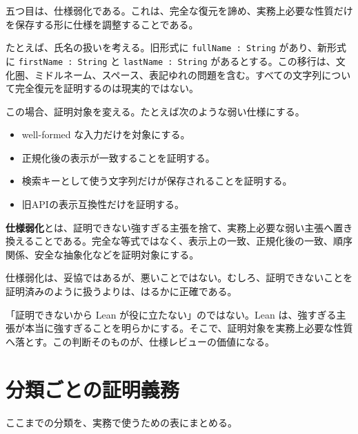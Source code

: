 五つ目は、仕様弱化である。これは、完全な復元を諦め、実務上必要な性質だけを保存する形に仕様を調整することである。

たとえば、氏名の扱いを考える。旧形式に \texttt{fullName : String} があり、新形式に \texttt{firstName : String} と \texttt{lastName : String} があるとする。この移行は、文化圏、ミドルネーム、スペース、表記ゆれの問題を含む。すべての文字列について完全復元を証明するのは現実的ではない。

この場合、証明対象を変える。たとえば次のような弱い仕様にする。

\begin{itemize}
\item well-formed な入力だけを対象にする。
\item 正規化後の表示が一致することを証明する。
\item 検索キーとして使う文字列だけが保存されることを証明する。
\item 旧APIの表示互換性だけを証明する。
\end{itemize}

\begin{definitionbox}
\textbf{仕様弱化}とは、証明できない強すぎる主張を捨て、実務上必要な弱い主張へ置き換えることである。完全な等式ではなく、表示上の一致、正規化後の一致、順序関係、安全な抽象化などを証明対象にする。
\end{definitionbox}

仕様弱化は、妥協ではあるが、悪いことではない。むしろ、証明できないことを証明済みのように扱うよりは、はるかに正確である。

\begin{warningbox}
「証明できないから Lean が役に立たない」のではない。Lean は、強すぎる主張が本当に強すぎることを明らかにする。そこで、証明対象を実務上必要な性質へ落とす。この判断そのものが、仕様レビューの価値になる。
\end{warningbox}

\section{分類ごとの証明義務}

ここまでの分類を、実務で使うための表にまとめる。

